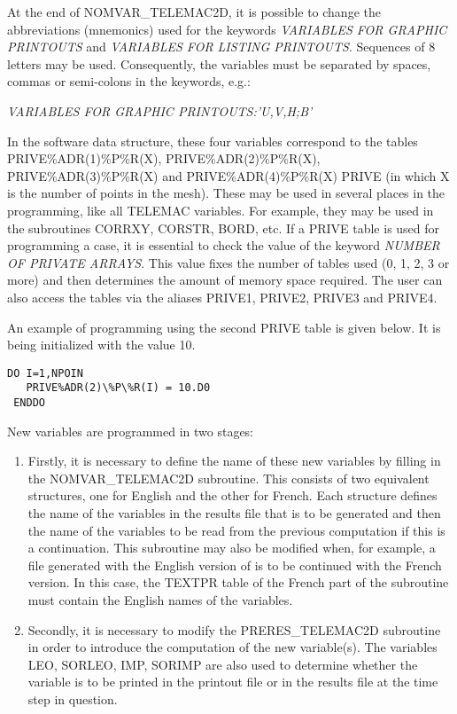  At the end of NOMVAR\_TELEMAC2D, it is possible to change the abbreviations (mnemonics) used for the keywords \textit{VARIABLES FOR GRAPHIC PRINTOUTS} and \textit{VARIABLES FOR LISTING PRINTOUTS}. Sequences of 8 letters may be used. Consequently, the variables must be separated by spaces, commas or semi-colons in the keywords, e.g.:

 \textit{VARIABLES FOR GRAPHIC PRINTOUTS:'U,V,H;B'}

 In the software data structure, these four variables correspond to the tables PRIVE\%ADR(1)\%P\%R(X), PRIVE\%ADR(2)\%P\%R(X), PRIVE\%ADR(3)\%P\%R(X) and PRIVE\%ADR(4)\%P\%R(X) PRIVE (in which X is the number of points in the mesh). These may be used in several places in the programming, like all TELEMAC variables. For example, they may be used in the subroutines CORRXY, CORSTR, BORD, etc. If a PRIVE table is used for programming a case, it is essential to check the value of the keyword \textit{NUMBER OF PRIVATE ARRAYS}. This value fixes the number of tables used (0, 1, 2, 3 or more) and then determines the amount of memory space required. The user can also access the tables via the aliases PRIVE1, PRIVE2, PRIVE3 and PRIVE4.

 An example of programming using the second PRIVE table is given below. It is being initialized with the value 10.
\begin{lstlisting}[language=TelFortran]
 DO I=1,NPOIN   
   PRIVE%ADR(2)\%P\%R(I) = 10.D0
 ENDDO
\end{lstlisting}
 New variables are programmed in two stages:

\begin{enumerate}
\item  Firstly, it is necessary to define the name of these new variables by filling in the NOMVAR\_TELEMAC2D subroutine. This consists of two equivalent structures, one for English and the other for French. Each structure defines the name of the variables in the results file that is to be generated and then the name of the variables to be read from the previous computation if this is a continuation. This subroutine may also be modified when, for example, a file generated with the English version of   is to be continued with the French version. In this case, the TEXTPR table of the French part of the subroutine must contain the English names of the variables.

\item  Secondly, it is necessary to modify the PRERES\_TELEMAC2D subroutine in order to introduce the computation of the new variable(s). The variables LEO, SORLEO, IMP, SORIMP are also used to determine whether the variable is to be printed in the printout file or in the results file at the time step in question.
\end{enumerate}



